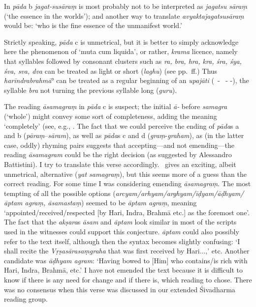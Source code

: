 {{ 
  
 
  In \textit{pāda} b \textit{jagat-susāraṃ} is most probably not 
  to be interpreted as \textit{jagatsu sāraṃ} {\rm (}`the essence in the worlds'{\rm )};
  and another way to translate \textit{avyaktajagatsusāraṃ} would be: 
  `who is the fine essence of the unmanifest world.'
 
  
 
  Strictly speaking, \textit{pāda} c is unmetrical, but it is better to 
  simply acknowledge here the phenomenon of `muta cum liquida', or rather,
  \textit{krama} licence, namely
  that syllables followed by consonant clusters such as 
  \textit{ra, bra, hra, kra, śra, śya, śva, sva, dva} can be treated as light or short {\rm (}\textit{laghu}{\rm )}
  {\rm (}see pp.~\pageref{muta}\thinspace ff.{\rm )}
  Thus \textit{harīndrabrahmā}° can be treated as a regular beginning
  of an \textit{upajāti} {\rm (}\shortsyllable\ - \shortsyllable\ - -{\rm )}, the syllable 
  \textit{bra} not turning the previous syllable long {\rm (}\textit{guru}{\rm )}.
 
  
 
  The reading \textit{āsamagraṃ} in \textit{pāda} c is suspect;
  the initial \textit{ā-} before \textit{samagra} {\rm (}`whole'{\rm )} might convey some sort of
  completeness, adding the meaning `completely'
  {\rm (}see, e.g., .
  The fact that we could perceive the ending of \textit{pāda}s a and b 
  {\rm (}\textit{pāraṃ}--\textit{sāram}{\rm )}, as well as \textit{pāda}s c and d {\rm (}\textit{graṃ}-\textit{graham}{\rm )},
  as {\rm (}in the latter case, oddly{\rm )} rhyming pairs 
  suggests that accepting---and not emending---the reading \textit{āsamagram} could be 
  the right decision {\rm (}as suggested by Alessandro Battistini{\rm )}.
  I try to translate this verse accordingly. \msM\ gives an exciting,
  albeit unmetrical, alternative {\rm (}\textit{yat samagraṃ}{\rm )}, but
  this seems more of a guess than the correct reading.
  For some time I was considering emending \textit{āsamagraṃ}.
  The most tempting of all the possible options 
  {\rm (}\textit{arcyam/arhyam/arghyam/īḍyam/āḍhyam/āptam agraṃ, āsamastaṃ}{\rm )} 
  seemed to be \textit{āptam agraṃ},
  meaning `appointed/received/respected [by Hari, Indra,
  Brahmā etc.] as the foremost one'. The fact that 
  the \textit{akṣara}s \textit{āsam} and \textit{āptam} look similar in most
  of the scripts used in the witnesses could support this
  conjecture. \textit{āptam} could also
  possibly refer to the text itself, although then the
  syntax becomes slightly confusing: `I shall recite the
  \textit{Vṛṣasārasaṃgraha} that was first received by Hari...,' etc.
  Another candidate was \textit{āḍhyam agram}:
  `Having bowed to [Him] who contains/is rich with Hari, Indra, Brahmā,
  etc.' I have not emended the text because it is difficult
  to know if there is any need for change and if there is, which reading 
  to chose. There was no consensus when this verse was discussed 
  in our extended Śivadharma reading group.
 
}}
